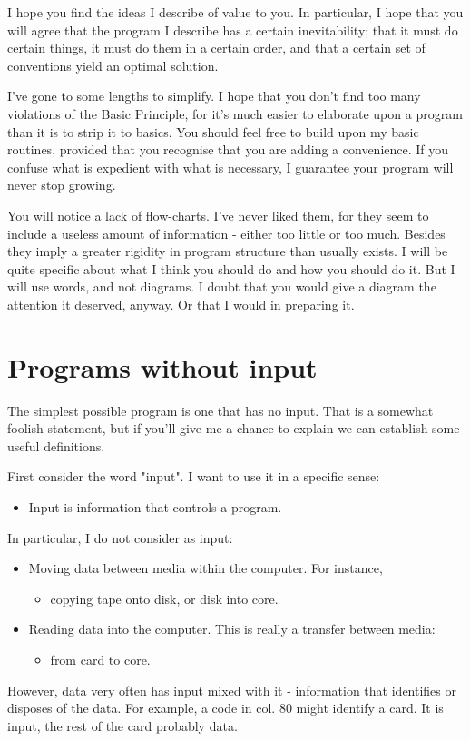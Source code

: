 \documentclass[b5paper, oneside]{book}
\begin{document}
I hope you find the ideas I describe of value to you. In particular, I hope that you will agree that the program I describe has a certain inevitability; that it must do certain things, it must do them in a certain order, and that a certain set of conventions yield an optimal solution.

I've gone to some lengths to simplify. I hope that you don't find too many violations of the Basic Principle, for it's much easier to elaborate upon a program than it is to strip it to basics. You should feel free to build upon my basic routines, provided that you recognise that you are adding a convenience. If you confuse what is expedient with what is necessary, I guarantee your program will never stop growing.

You will notice a lack of flow-charts. I've never liked them, for they seem to include a useless amount of information - either too little or too much. Besides they imply a greater rigidity in program structure than usually exists. I will be quite specific about what I think you should do and how you should do it. But I will use words, and not diagrams. I doubt that you would give a diagram the attention it deserved, anyway. Or that I would in preparing it.



\chapter{Programs without input}
The simplest possible program is one that has no input. That is a somewhat foolish statement, but if you'll give me a chance to explain we can establish some useful definitions.

First consider the word "input". I want to use it in a specific sense:
\begin{itemize}
   \item Input is information that controls a program.
\end{itemize}

In particular, I do not consider as input:
\begin{itemize}
   \item Moving data between media within the computer. For instance,
   \begin{itemize}
      \item copying tape onto disk, or disk into core.
   \end{itemize}
   \item Reading data into the computer. This is really a transfer between media:
   \begin{itemize}
      \item from card to core.
   \end{itemize}
\end{itemize}
However, data very often has input mixed with it - information that identifies or disposes of the data. For example, a code in col. 80 might identify a card. It is input, the rest of the card probably data.
\end{document}

